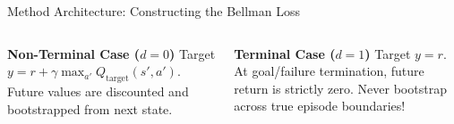 \documentclass[aspectratio=169,10pt]{beamer}
\begin{document}
\begin{frame}{Method Architecture: Constructing the Bellman Loss}
{
  \par}

  \vspace{0.14cm}
  \begin{columns}[T,onlytextwidth]
      \begin{block}{\small\color{islteal}\textbf{Non-Terminal Case ($d=0$)}}
        \footnotesize Target $y = r + \gamma \max_{a'} Q_{\text{target}}(s', a')$. Future values are discounted and bootstrapped from next state.
      \end{block}
      \begin{block}{\small\color{islred}\textbf{Terminal Case ($d=1$)}}
        \footnotesize Target $y = r$. At goal/failure termination, future return is strictly zero. Never bootstrap across true episode boundaries!
      \end{block}
  \end{columns}
\end{frame}
\end{document}
